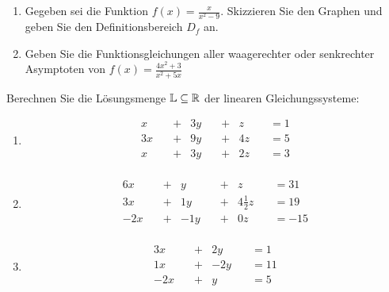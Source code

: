 	\begin{enumerate}
		\item Gegeben sei die Funktion $f(x)=\frac{x}{x^2-9}$. Skizzieren Sie den Graphen und geben Sie den Definitionsbereich $D_f$ an.
		\item	Geben Sie die Funktionsgleichungen aller waagerechter oder senkrechter Asymptoten von $f(x)=\frac{4x^2+3}{x^2+5x}$
	\end{enumerate}



	\newcommand{\lgslinethree}[4]{#1 x\quad &+&  #2 y\quad &+&  #3 z\quad & = #4 \\}
	\newcommand{\lgslinetwo}[3]{#1 x\quad &+&  #2 y\quad & = #3 \\}
	Berechnen Sie die Lösungsmenge $\mathbb{L}\subseteq\mathbb{R}$ der linearen Gleichungssysteme:
	\begin{multicols}{2}
		\begin{enumerate}
			\item
			\begin{alignat*}{5}
				\lgslinethree{}{3}{}{1}
				\lgslinethree{3}{9}{4}{5}
				\lgslinethree{}{3}{2}{3}
			\end{alignat*}
			\item
			\begin{alignat*}{4}
				\lgslinethree{6}{}{}{31}
				\lgslinethree{3}{1}{4\frac 1 2}{19}
				\lgslinethree{-2}{-1}{0}{-15}
			\end{alignat*}
			\item
			\begin{alignat*}{4}
				\lgslinetwo{3}{2}{1}
				\lgslinetwo{1}{-2}{11}
				\lgslinetwo{-2}{}{5}
			\end{alignat*}
		\end{enumerate}
	\end{multicols}



\begin{lsg}{}

\end{lsg}


